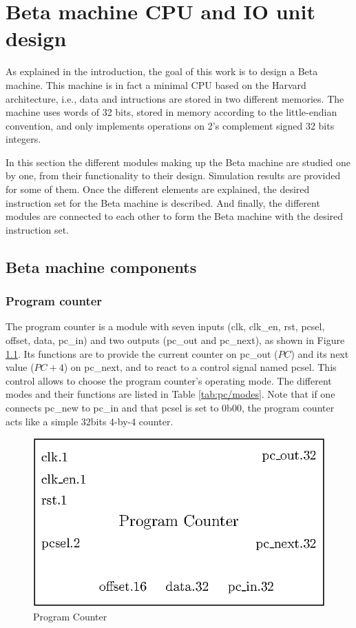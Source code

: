 \chapter{Beta machine CPU and IO unit design}

As explained in the introduction, the goal of this work is to design a Beta machine. This machine is 
in fact a minimal CPU based on the Harvard architecture, i.e., data and intructions are stored in 
two different memories. The machine uses words of 32 bits, stored in memory according to the little-endian convention, 
and only implements operations on 2's complement signed 32 bits integers. 

In this section the different modules making up the Beta machine are studied one by one, from 
their functionality to their design. Simulation results are provided for some of them. Once the 
different elements are explained, the desired instruction set for the Beta machine is
described. And finally, the different modules are connected to each other to form the Beta
machine with the desired instruction set.

\section{Beta machine components}

\subsection{Program counter}

The program counter is a module with seven inputs (clk, clk\_en, rst, pcsel, offset, data, pc\_in) 
and two outputs (pc\_out and pc\_next), as shown in Figure \ref{fig:components/pc}. 
Its functions are to provide the current counter on pc\_out ($PC$) and its 
next value ($PC + 4$) on pc\_next, and to react to a control signal named pcsel. This control 
allows to choose the program counter's operating mode. The different modes and their functions
are listed in Table \ref{tab:pc/modes}. Note that if one connects pc\_new to pc\_in and that pcsel
is set to 0b00, the program counter acts like a simple 32bits 4-by-4 counter.

\begin{figure}[H]
    \centering
    \includegraphics[scale=0.8]{Chapter3-CPU/res/pc}
    \caption{Program Counter}
    \label{fig:components/pc}
\end{figure}

